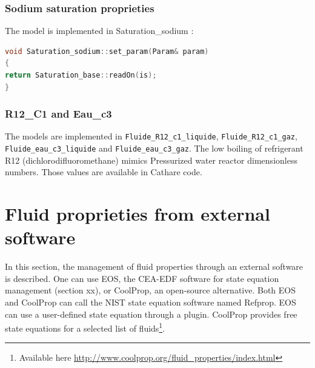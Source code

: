 \subsubsection{Sodium saturation proprieties}
The model is implemented in Saturation_sodium :
\begin{lstlisting}[language=c++]
void Saturation_sodium::set_param(Param& param)
{
return Saturation_base::readOn(is);
}
\end{lstlisting}

\subsubsection{R12_C1 and Eau_c3}
The models are implemented in \texttt{Fluide\_R12\_c1\_liquide}, \texttt{Fluide\_R12\_c1\_gaz}, \texttt{Fluide\_eau\_c3\_liquide} and \texttt{Fluide\_eau\_c3\_gaz}. The low boiling of refrigerant R12 (dichlorodifluoromethane) mimics Pressurized water reactor dimensionless numbers. Those values are available in Cathare code.\\

\section{Fluid proprieties from external software\label{sec:fluid-prop-ext}}
In this section, the management of fluid properties through an external software is described. One can use EOS, the CEA-EDF software for state equation management (section xx), or CoolProp, an open-source alternative. Both EOS and CoolProp can call the NIST state equation software named Refprop. EOS can use a user-defined state equation through a plugin. CoolProp provides free state equations for a selected list of fluids\footnote{Available here \href{http://www.coolprop.org/fluid_properties/index.html}{http://www.coolprop.org/fluid_properties/index.html}}.

